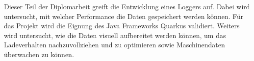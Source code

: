 Dieser Teil der Diplomarbeit greift die Entwicklung eines Loggers auf. Dabei wird untersucht, mit welcher Performance die Daten gespeichert werden können. Für das Projekt wird die Eignung des Java Frameworks Quarkus validiert. Weiters wird untersucht, wie die Daten visuell aufbereitet werden können, um das Ladeverhalten nachzuvollziehen und zu optimieren sowie Maschinendaten überwachen zu können.


